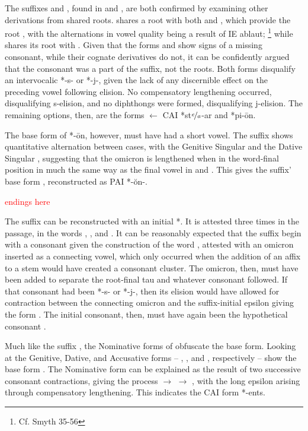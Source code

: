 The suffixes  and , found in  and ,
are both confirmed by examining other derivations from shared roots. 
shares a root with both  and , which provide
the root , with the alternations in vowel quality being a result
of IE ablaut; \footnote{Cf. Smyth 35-56} while  shares its root with
. Given that the forms  and  show signs
of a missing consonant, while their cognate derivatives do not, it can be
confidently argued that the consonant was a part of the suffix, not the roots.
Both forms disqualify an intervocalic *-s- or *-j-, given the lack of any
discernible effect on the preceding vowel following elision.
No compensatory lengthening occurred, disqualifying s-elision, and no
diphthongs were formed, disqualifying j-elision. The remaining options, then,
are the forms  $\gets$ CAI *st$\nicefrac{e}{a}$-\w ar and
*pi-\w \=on. 

The base form of *-\w\=on, however, must have had a short vowel.
The suffix shows quantitative alternation between cases, with the
Genitive Singular  and the Dative Singular ,
suggesting that the omicron  is lengthened when in the
word-final position in much the same way as the final vowel in
 and . This gives the suffix' base form
, reconstructed as PAI *-\w\u{o}n-.

\textcolor{red}{ endings here}

The suffix  can be reconstructed with an initial *\w.
It is attested three times in the passage, in the words ,
, and .
It can be reasonably expected that the suffix begin with a consonant
given the construction of the word , attested with
an omicron  inserted as a connecting vowel, which only
occurred when the addition of an affix to a stem would have created a
consonant cluster. The omicron, then, must have been added to separate
the root-final tau  and whatever consonant followed.
If that consonant had been *-s- or *-j-, then its elision would have
allowed for contraction between the connecting omicron 
and the suffix-initial epsilon  giving the form
. The initial consonant, then, must have again been the
hypothetical consonant \w.

Much like the suffix , the Nominative forms of 
obfuscate the base form. Looking at the Genitive, Dative, and Accusative
forms -- , , and , respectively --
show the base form . The Nominative form can be explained
as the result of two successive consonant contractions, giving the
process  $\to$  $\to$ , with
the long epsilon 
arising through compensatory
lengthening. This indicates the CAI form *-\w ents.

